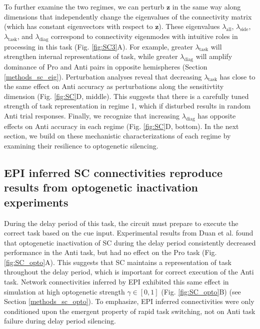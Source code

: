 \documentclass[11pt]{article}
\begin{document}
To further examine the two regimes, we can perturb $\mathbf{z}$ in the same way along dimensions that independently change the eigenvalues of the connectivity matrix (which has constant eigenvectors with respect to $\mathbf{z}$).  These eigenvalues $\lambda_{\text{all}}$, $\lambda_{\text{side}}$, $\lambda_{\text{task}}$, and $\lambda_{\text{diag}}$ correspond to connectivity eigenmodes with intuitive roles in processing in this task (Fig. \ref{fig:SC3}A).
For example, greater $\lambda_{\text{task}}$ will strengthen internal representations of task, while greater $\lambda_{\text{diag}}$ will amplify dominance of Pro and Anti pairs in opposite hemispheres (Section \ref{methods_sc_eig}).
Perturbation analyses reveal that decreasing $\lambda_{\text{task}}$ has close to the same effect on Anti accuracy as perturbations along the sensitivtity dimension (Fig. \ref{fig:SC}D, middle).
This suggests that there is a carefully tuned strength of task representation in regime 1, which if disturbed results in random Anti trial responses.
Finally, we recognize that increasing $\lambda_{\text{diag}}$ has opposite effects on Anti accuracy in each regime (Fig. \ref{fig:SC}D, bottom).
In the next section, we build on these mechanistic characterizations of each regime by examining their resilience to optogenetic silencing.

\subsection{EPI inferred SC connectivities reproduce results from optogenetic inactivation experiments} \label{results_SC_opt}

During the delay period of this task, the circuit must prepare to execute the correct task based on the cue input.
Experimental results from Duan et al. found that optogenetic inactivation of SC during the delay period consistently decreased performance in the Anti task, but had no effect on the Pro task (Fig. \ref{fig:SC_opto}A).
This suggests that SC maintains a representation of task throughout the delay period, which is important for correct execution of the Anti task.
Network connectivities inferred by EPI exhibited this same effect in simulation at high  optogenetic strength $\gamma \in [0, 1]$ (Fig. \ref{fig:SC_opto}B) (see Section \ref{methods_sc_opto}).
To emphasize, EPI inferred connectivities were only conditioned upon the emergent property of rapid task switching, not on Anti task failure during delay period silencing.
\end{document}
